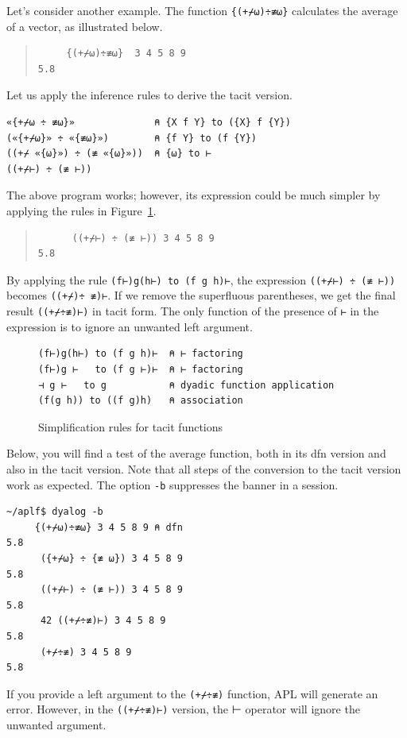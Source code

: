 \documentclass[a4paper,12pt]{book}
\begin{document}
Let's consider another example.
The function \verb|{(+⌿⍵)÷≢⍵}| calculates
the average of a vector, as illustrated below.
\begin{quote}
\begin{verbatim}
     {(+⌿⍵)÷≢⍵}  3 4 5 8 9
5.8
\end{verbatim}
\end{quote}
Let us apply the inference rules
to derive the tacit version.
\begin{verbatim}
«{+⌿⍵ ÷ ≢⍵}»              ⍝ {X f Y} to ({X} f {Y})
(«{+⌿⍵}» ÷ «{≢⍵}»)        ⍝ {f Y} to (f {Y})
((+⌿ «{⍵}») ÷ (≢ «{⍵}»))  ⍝ {⍵} to ⊢
((+⌿⊢) ÷ (≢ ⊢))
\end{verbatim}
The above program works; however, its
expression could be much simpler by applying
the rules in Figure~\ref{fig:simplification}.
\begin{quote}
\begin{verbatim}
      ((+⌿⊢) ÷ (≢ ⊢)) 3 4 5 8 9
5.8
\end{verbatim}
\end{quote}
By applying the rule \verb|(f⊢)g(h⊢) to (f g h)⊢|,
the expression \verb|((+⌿⊢) ÷ (≢ ⊢))|
becomes \verb|((+⌿)÷ ≢)⊢|. If we remove
the superfluous parentheses, we get the final
result \verb|((+⌿÷≢)⊢)| in tacit form.
The only function of the presence of \verb|⊢| in
the expression is to ignore an unwanted left argument.


\begin{figure}[!t]
\begin{verbatim}
(f⊢)g(h⊢) to (f g h)⊢  ⍝ ⊢ factoring
(f⊢)g ⊢   to (f g ⊢)⊢  ⍝ ⊢ factoring
⊣ g ⊢   to g           ⍝ dyadic function application
(f(g h)) to ((f g)h)   ⍝ association
\end{verbatim}
\caption{Simplification rules for tacit functions}
\label{fig:simplification}
\end{figure}

Below, you will find a test of the average
function, both in its dfn version and also
in the tacit version. Note that all steps
of the conversion to the tacit version
work as expected. The option \verb|-b|
suppresses the banner in a session.
\begin{verbatim}
~/aplf$ dyalog -b
     {(+⌿⍵)÷≢⍵} 3 4 5 8 9 ⍝ dfn
5.8
      ({+⌿⍵} ÷ {≢ ⍵}) 3 4 5 8 9
5.8
      ((+⌿⊢) ÷ (≢ ⊢)) 3 4 5 8 9
5.8
      42 ((+⌿÷≢)⊢) 3 4 5 8 9
5.8
      (+⌿÷≢) 3 4 5 8 9
5.8
\end{verbatim}
If you provide a left argument to the \verb|(+⌿÷≢)|
function, APL will generate an error.
However, in the \verb|((+⌿÷≢)⊢)| version,
the ⊢ operator will ignore the unwanted argument.
\end{document}
